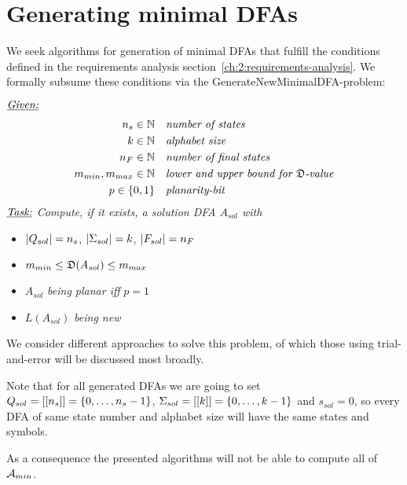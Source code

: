 
\chapter{Generating minimal DFAs} \label{ch:3}

We seek algorithms for generation of minimal DFAs that fulfill the conditions defined in the requirements analysis section~\ref{ch:2:requirements-analysis}. We formally subsume these conditions via the GenerateNewMinimalDFA-problem:
\begin{definition}[GenerateNewMinimalDFA] $ $ \\
	$ $ \vspace{-0.4cm} \\
	\noindent $\underline{\emph{Given:}}$
	\vspace{-0.5cm}
	\begin{align*}
	{n_s} \in \mathbb{N}\ \ \ & \emph{number of states} \\
	k \in \mathbb{N}\ \ \ & \emph{alphabet size} \\
	{n_F} \in \mathbb{N}\ \ \ & \emph{number of final states} \\
	m_{min}, m_{max} \in \mathbb{N}\ \ \ & \emph{lower and upper bound for $\mathfrak{D}$-value} \\
	p \in \{0,1\}\ \ \ & \emph{planarity-bit}
	\end{align*}
	\noindent $\underline{\emph{Task:}}$ \emph{Compute, if it exists, a solution DFA $A_{sol}$ with}
	\begin{itemize}
		\item $|Q_{sol}|={n_s}$, $|\Sigma_{sol}|=k$, $|F_{sol}|={n_F}$
		\item $m_{min} \le \mathfrak{D}(A_{sol}) \le m_{max}$
		\item $A_{sol}$ \emph{being planar iff} $p = 1$
		\item $L(A_{sol})$ \emph{being new}
	\end{itemize}
\end{definition}
\noindent We consider different approaches to solve this problem, of which those using trial-and-error will be discussed most broadly.

\begin{remark}\label{ch:3:rem:qas-set}
	Note that for all generated DFAs we are going to set $Q_{sol} = [[{n_s}]] = \{0,\ldots,{n_s}-1\}$, $\Sigma_{sol} = [[k]] = \{0,\ldots,k-1\}$ and $s_{sol} = 0$, so every DFA of same state number and alphabet size will have the same states and symbols.
\end{remark}
\noindent As a consequence the presented algorithms will not be able to compute all of ${\mathcal{A}_{min}}$.


